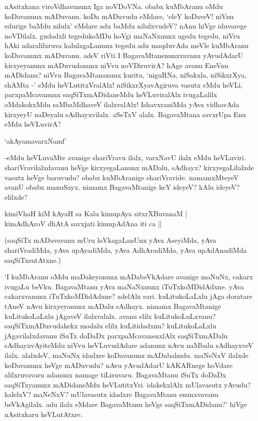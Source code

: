 nAsitxkana viroVdhavanunx Iga noVDoVNa. obabx kuMbAranu oMdu koDavanunx mADuvanu. koDa mADuvudu eMdare, `eleY koDaveV! niVnu edurige baMdu nilulx' eMdare adu baMdu nilulxvudeV? nAnu hiVge iduvarege noVDilalx. gudadxli tegedukoMDu hoVgi maNaNxnunx agedu tegedu, niVru hAki adaralilxruva kalulxgaLanunx tegedu adu maqduvAda meVle kuMbAranu koDavanunx mADuvanu. adeV riVti I BagavaMtanenunxvavanu yAvudAdarU kirxyeyanunx mADuvudanunx niVvu noVDiruvirA? hAge avanu EneVnu mADidanu? niVvu BagavaMtananunx kuritu, `niguRNa, niSakxla, niSikxrXya, shAMta -' eMdu heVLutitxVralAlx! niSikxrXyavAgiruva vasutx eMdu heVLi, parxpaMcavanunx saqSiTxmADidaneMdu heVLuviralAlx ivugaLalilx oMdakokxMdu saMbaMdhaveV ilalxvalAlx! IshavxraniMda yAva vidhavAda kirxyeyU naDeyalu sAdhayxvilalx. aSeTxV alalx. BagavaMtana savxrUpa Enu eMdu heVLuvirA?


\begin{shloka}
`akAyamavarxNamf'
\end{shloka}

-eMdu heVLuvaMte avanige shariVravu ilalx, varxNavU ilalx eMdu heVLuviri. shariVravilalxdavanu heVge kirxyegaLanunx mADalu, sAdhayx? kirxyegaLilalxde vasutx heVge baruvudu? obabx kuMbAranige shariVravide. namamxMteyeV avanU obabx manuSayx. nimamx BagavaMtanige keY ideyeV? kAlu ideyeV? elilxde?

\begin{shloka}
kimiVhaH kiM kAyaH sa Kalu kimupAya sitxrXBuvanaM |\\
kimAdhAroV dhAtA savxjati kimupAdAna iti ca ||
\end{shloka}

(saqSiTx mADuvavanu mUru loVkagaLanUnx yAva AseyiMda, yAva shariVradiMda, yAva upAyadiMda, yAva AdhAradiMda, yAva upAdAnadiMda saqSiTxsutAtxne.)

`I kuMbAranu oMdu maDakeyanunx mADabeVkAdare avanige maNuNx, cakarx ivugaLu beVku. BagavaMtanu yAva maNaNxnunx iTuTxkoMDidAdxne. yAva cakarxvanunx iTuTxkoMDidAdxne? adelAlx sari. kuLitukoLaLxlu jAga doratare tAneV nAvu kirxyeyanunx mADalu sAdhayx. nimamx BagavaMtanige kuLitukoLaLxlu jAgaveV ilalxvalalx. avanu elilx kuLitukoLuLxvanu? saqSiTxmADuvudakekx modalu elilx kuLitidadxnu? kuLitukoLaLxlu jAgavilalxdavanu iSuTx doDaDx parxpaMcavanenxlAlx saqSiTxmADalu sAdhayxvAyiteMdu niVvu heVLuvudAdare adanunx nAvu naMbalu sAdhayxveV ilalx. alalxdeV, maNuNx idadxre koDavanunx mADabahudu. maNeNxV ilalxde koDavanunx heVge mADuvudu? nAvu yAvudAdarU kAKARnege hoVdare alilxruvavaru adanunx namage tiLisuvaru. BagavaMtanu iSuTx doDaDx saqSiTxyanunx mADidaneMdu heVLutitxVri. idakekxlAlx mUlavasutx yAvudu? kalelxV? maNeNxV? mUlavasutx idadxre BagavaMtanu enunxvavanu beVkAgilalx. adu ilalx eMdare BagavaMtanu heVge saqSiTxmADidanu?' hiVge nAsitxkaru keVLutAtxre.

